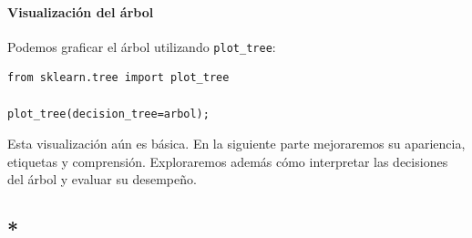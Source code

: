 \documentclass{article}
\theoremstyle{nonumberplain}
\begin{document}
\paragraph{Visualización del árbol}

Podemos graficar el árbol utilizando \texttt{plot\_tree}:

\begin{verbatim}
from sklearn.tree import plot_tree

plot_tree(decision_tree=arbol);
\end{verbatim}

Esta visualización aún es básica. En la siguiente parte mejoraremos su apariencia, etiquetas y comprensión. Exploraremos además cómo interpretar las decisiones del árbol y evaluar su desempeño.

\subsection{*}
\end{document}
